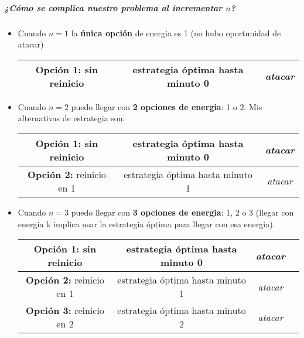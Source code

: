 \subparagraph{¿Cómo se complica nuestro problema al incrementar $n$?} 
\begin{itemize}
    \item Cuando $n=1$ la \textbf{única opción} de energia es 1 (no hubo oportunidad de atacar)
        \begin{center}
        \begin{tabular}{ |c|c|c| }
        \hline
         \textbf{Opción 1:} sin reinicio & estrategia óptima hasta minuto 0& \textit{atacar} \\
         \hline
        \end{tabular}
        \end{center}
        
    \item Cuando $n=2$ puedo llegar con \textbf{2 opciones de energia}: 1 o 2. Mis alternativas de estrategia son: 
        \begin{center}
        \begin{tabular}{ |c|c|c| }
        \hline
         \textbf{Opción 1:} sin reinicio& estrategia óptima hasta minuto 0& \textit{atacar} \\
         \hline
         \textbf{Opción 2:} reinicio en 1& estrategia óptima hasta minuto 1& \textit{atacar} \\
        \hline
        \end{tabular}
        \end{center}
        
    \item Cuando $n=3$ puedo llegar con \textbf{3 opciones de energia}: 1, 2 o 3 (llegar con energia k implica usar la estrategia óptima para llegar con esa energia).
        \begin{center}
        \begin{tabular}{ |c|c|c|c| }
        \hline
         \textbf{Opción 1:} sin reinicio& estrategia óptima hasta minuto 0& \textit{atacar} \\
         \hline
         \textbf{Opción 2:} reinicio en 1& estrategia óptima hasta minuto 1& \textit{atacar} \\
        \hline
         \textbf{Opción 3:} reinicio en 2& estrategia óptima hasta minuto 2& \textit{atacar} \\
        \hline
        \end{tabular}
        \end{center}
        

\end{itemize}
